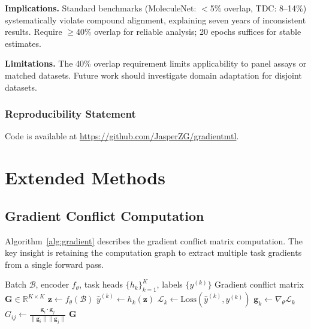 \documentclass[sigconf,nonacm]{acmart}
\newcommand{\G}{\mathbf{G}}
\begin{document}
\textbf{Implications.} Standard benchmarks (MoleculeNet: $<$5\% overlap, TDC: 8--14\%) systematically violate compound alignment, explaining seven years of inconsistent results. Require $\geq$40\% overlap for reliable analysis; 20 epochs suffices for stable estimates.

\textbf{Limitations.} The 40\% overlap requirement limits applicability to panel assays or matched datasets. Future work should investigate domain adaptation for disjoint datasets.

\subsubsection*{Reproducibility Statement}
Code is available at \url{https://github.com/JasperZG/gradientmtl}.




\newpage
\appendix

\section{Extended Methods}

\subsection{Gradient Conflict Computation}

Algorithm~\ref{alg:gradient} describes the gradient conflict matrix computation. The key insight is retaining the computation graph to extract multiple task gradients from a single forward pass.

\begin{algorithm}[ht]
\caption{Gradient Conflict Matrix Computation}
\label{alg:gradient}
\begin{algorithmic}[1]
\REQUIRE Batch $\mathcal{B}$, encoder $f_\theta$, task heads $\{h_k\}_{k=1}^K$, labels $\{y^{(k)}\}$
\ENSURE Gradient conflict matrix $\G \in \mathbb{R}^{K \times K}$
\STATE $\mathbf{z} \leftarrow f_\theta(\mathcal{B})$ 
    \STATE $\hat{y}^{(k)} \leftarrow h_k(\mathbf{z})$ 
    \STATE $\mathcal{L}_k \leftarrow \text{Loss}(\hat{y}^{(k)}, y^{(k)})$ 
    \STATE $\mathbf{g}_k \leftarrow \nabla_\theta \mathcal{L}_k$ 
\ENDFOR
{}
        \STATE $G_{ij} \leftarrow \frac{\mathbf{g}_i \cdot \mathbf{g}_j}{\|\mathbf{g}_i\| \|\mathbf{g}_j\|}$ 
    \ENDFOR
\ENDFOR
\RETURN $\G$
\end{algorithmic}
\end{algorithm}
\end{document}
